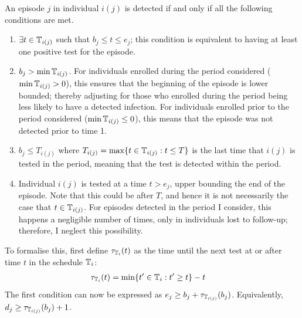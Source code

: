 \documentclass[thesis.tex]{subfiles}
\begin{document}
An episode $j$ in individual $i(j)$ is detected if and only if all the following conditions are met.
\begin{enumerate}
    \item $\exists t \in \mathbb{T}_{i(j)}$ such that $b_j \leq t \leq e_j$; this condition is equivalent to having at least one positive test for the episode.
    \item $b_j > \min \mathbb{T}_{i(j)}$.
      For individuals enrolled during the period considered ($\min \mathbb{T}_{i(j)} > 0$), this ensures that the beginning of the episode is lower bounded; thereby adjusting for those who enrolled during the period being less likely to have a detected infection.
      For individuals enrolled prior to the period considered ($\min \mathbb{T}_{i(j)} \leq 0$), this means that the episode was not detected prior to time 1.
    \item $b_j \leq T_{i(j)}$ where $T_{i(j)} = \max \{ t \in \mathbb{T}_{i(j)} : t \leq T \}$ is the last time that $i(j)$ is tested in the period, meaning that the test is detected within the period.
    \item Individual $i(j)$ is tested at a time $t > e_j$, upper bounding the end of the episode.
      Note that this could be after $T$, and hence it is not necessarily the case that $t \in \mathbb{T}_{i(j)}$.
      For episodes detected in the period I consider, this happens a negligible number of times, only in individuals lost to follow-up; therefore, I neglect this possibility.
\end{enumerate}

To formalise this, first define $\tau_{\mathbb{T}_i}(t)$ as the time until the next test at or after time $t$ in the schedule $\mathbb{T}_i$:
\begin{align}
\tau_{\mathbb{T}_i}(t) &= \min \{ t' \in \mathbb{T}_i : t' \geq t \} - t
\label{perf-test:eq:tau-def}
\end{align}
The first condition can now be expressed as $e_j \geq b_j + \tau_{\mathbb{T}_{i(j)}}(b_j)$.
Equivalently, $d_j \geq \tau_{\mathbb{T}_{i(j)}}(b_j) + 1$.
\end{document}
